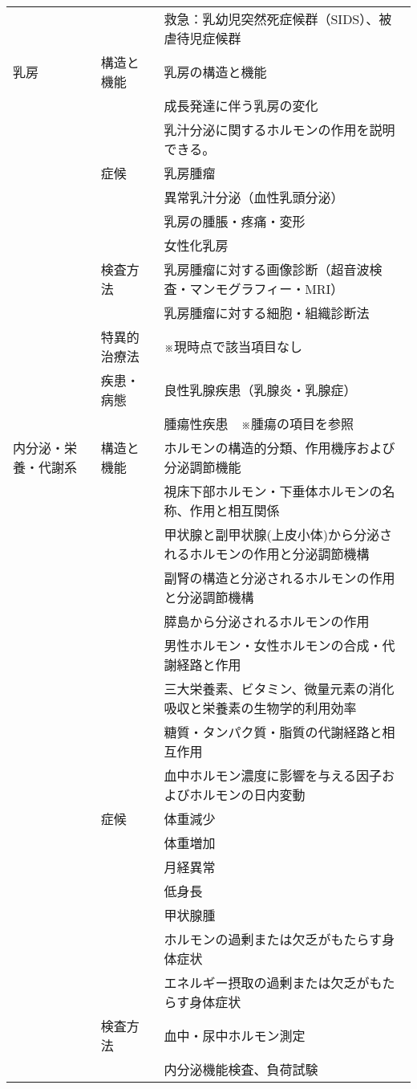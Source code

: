 \documentclass[
]{ltjsarticle}
\begin{document}
\begin{xltabular}{\linewidth}{XXX}
 &  & 救急：乳幼児突然死症候群（SIDS）、被虐待児症候群 \\
乳房 & 構造と機能 & 乳房の構造と機能 \\
 &  & 成長発達に伴う乳房の変化 \\
 &  & 乳汁分泌に関するホルモンの作用を説明できる。 \\
 & 症候 & 乳房腫瘤 \\
 &  & 異常乳汁分泌（血性乳頭分泌） \\
 &  & 乳房の腫脹・疼痛・変形 \\
 &  & 女性化乳房 \\
 & 検査方法 & 乳房腫瘤に対する画像診断（超音波検査・マンモグラフィー・MRI） \\
 &  & 乳房腫瘤に対する細胞・組織診断法 \\
 & 特異的治療法 & ※現時点で該当項目なし \\
 & 疾患・病態 & 良性乳腺疾患（乳腺炎・乳腺症） \\
 &  & 腫瘍性疾患　※腫瘍の項目を参照 \\
内分泌・栄養・代謝系 & 構造と機能 & ホルモンの構造的分類、作用機序および分泌調節機能 \\
 &  & 視床下部ホルモン・下垂体ホルモンの名称、作用と相互関係 \\
 &  & 甲状腺と副甲状腺(上皮小体)から分泌されるホルモンの作用と分泌調節機構 \\
 &  & 副腎の構造と分泌されるホルモンの作用と分泌調節機構 \\
 &  & 膵島から分泌されるホルモンの作用 \\
 &  & 男性ホルモン・女性ホルモンの合成・代謝経路と作用 \\
 &  & 三大栄養素、ビタミン、微量元素の消化吸収と栄養素の生物学的利用効率 \\
 &  & 糖質・タンパク質・脂質の代謝経路と相互作用 \\
 &  & 血中ホルモン濃度に影響を与える因子およびホルモンの日内変動 \\
 & 症候 & 体重減少 \\
 &  & 体重増加 \\
 &  & 月経異常 \\
 &  & 低身長 \\
 &  & 甲状腺腫 \\
 &  & ホルモンの過剰または欠乏がもたらす身体症状 \\
 &  & エネルギー摂取の過剰または欠乏がもたらす身体症状 \\
 & 検査方法 & 血中・尿中ホルモン測定 \\
 &  & 内分泌機能検査、負荷試験 \\

\end{xltabular}
\end{document}
